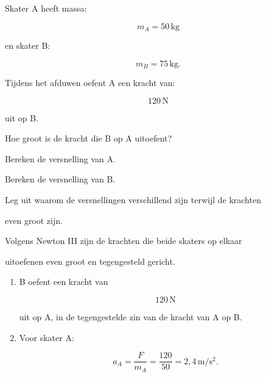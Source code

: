 \documentclass{ximera}
\begin{document}
\begin{oefening}{\oefU\ESS}

Skater A heeft massa:

\[m_A=50\,\mathrm{kg}\]

en skater B:

\[m_B=75\,\mathrm{kg}.\]

Tijdens het afduwen oefent A een kracht van:

\[120\,\mathrm N\]

uit op B.

\begin{question}

Hoe groot is de kracht die B op A uitoefent?

\end{question}

\begin{question}

Bereken de versnelling van A.

\end{question}

\begin{question}

Bereken de versnelling van B.

\end{question}

\begin{question}

Leg uit waarom de versnellingen verschillend zijn terwijl de krachten

even groot zijn.

\end{question}


\begin{oplossing}

Volgens Newton III zijn de krachten die beide skaters op elkaar

uitoefenen even groot en tegengesteld gericht.

\begin{enumerate}

  \item B oefent een kracht van

  \[\boxed{120\,\mathrm N}\]

  uit op A, in de tegengestelde zin van de kracht van A op B.

  \item Voor skater A:

  \[a_A=\frac{F}{m_A} =\frac{120}{50} =2{,}4\,\mathrm{m/s^2}.\]


\end{enumerate}
\end{oplossing}
\end{oefening}
\end{document}
